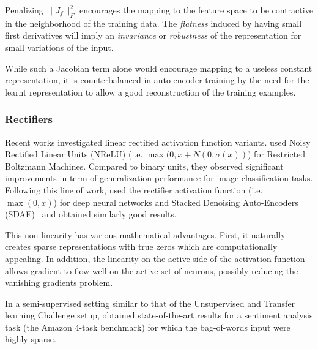 Penalizing $\|J_f\|_F^2$ encourages the mapping to the feature space to be
contractive in the neighborhood of the training data.   The {\em flatness}
induced by having small first derivatives will imply an {\em invariance}
or {\em robustness} of the representation for small variations of the input.

While such a Jacobian term alone would encourage mapping to a useless constant
representation, it is counterbalanced in auto-encoder training by the need for
the learnt representation to allow a good reconstruction of the training
examples.


\subsubsection{Rectifiers}



Recent works investigated linear rectified activation function variants.
\citep{Nair+Hinton-2010} used Noisy Rectified Linear Units (NReLU) (i.e.
$\max(0,x+N(0,\sigma(x))$) for Restricted Boltzmann Machines.  Compared to
binary units, they observed significant improvements in term of generalization
performance for image classification tasks. Following this line of work,
\citep{Glorot+al-AI-2011} used the rectifier activation function (i.e.
$\max(0,x)$) for deep neural networks and Stacked Denoising Auto-Encoders
(SDAE)~\citep{VincentPLarochelleH2008,Vincent-JMLR-2010} and obtained 
similarly good results.


This non-linearity has various mathematical advantages. First, it naturally 
creates sparse representations with true zeros which are computationally 
appealing. In addition, the linearity on the active side of the activation function
allows gradient to flow well on the active set of neurons, possibly reducing the 
vanishing gradients problem.

In a semi-supervised setting similar to that of the Unsupervised and
Transfer learning Challenge setup, \citep{Glorot+al-AI-2011} obtained 
state-of-the-art results for a sentiment analysis task (the Amazon 4-task benchmark) 
for which the  bag-of-words input were highly sparse.

